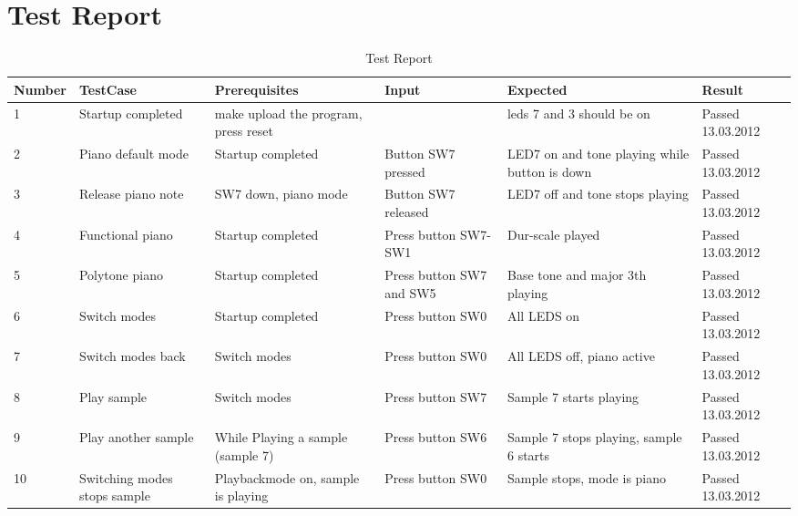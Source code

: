 \section{Test Report}
\begin{table}[h]
  \begin{tabular}{|p{1.1cm}|p{1.5cm}|p{2cm}|p{2cm}|p{2cm}|p{2cm}|}
    \hline
    Number&
    TestCase&
    Prerequisites&
    Input&
    Expected&
    Result\\
    \hline
    1& Startup completed&
    make upload the program, press reset&
    &
    leds 7 and 3 should be on&
    \textcolor{dkgreen}{Passed} 13.03.2012\\
    \hline
    2&
    Piano default mode&
    Startup completed&
    Button SW7 pressed&
    LED7 on and tone playing while button is down&
    \textcolor{dkgreen}{Passed} 13.03.2012\\
    \hline
    3&
    Release piano note&
    SW7 down, piano mode&
    Button SW7 released&
    LED7 off and tone stops playing&
    \textcolor{dkgreen}{Passed} 13.03.2012\\
    \hline
    4&
    Functional piano&
    Startup completed&
    Press button SW7-SW1&
    Dur-scale played&
    \textcolor{dkgreen}{Passed} 13.03.2012\\
    \hline
    5&
    Polytone piano&
    Startup completed&
    Press button SW7 and SW5&
    Base tone and major 3th playing&
    \textcolor{dkgreen}{Passed} 13.03.2012\\

    \hline
    6&
    Switch modes&
    Startup completed&
    Press button SW0&
    All LEDS on&
    \textcolor{dkgreen}{Passed} 13.03.2012\\
    \hline
    7&
    Switch modes back&
    Switch modes&
    Press button SW0&
    All LEDS off, piano active&
    \textcolor{dkgreen}{Passed} 13.03.2012\\
    \hline
    8&
    Play sample&
    Switch modes&
    Press button SW7&
    Sample 7 starts playing&
    \textcolor{dkgreen}{Passed} 13.03.2012\\
    \hline
    9&
    Play another sample&
    While Playing a sample (sample 7)&
    Press button SW6&
    Sample 7 stops playing, sample 6 starts&
    \textcolor{dkgreen}{Passed} 13.03.2012\\
    \hline
    10&
    Switching modes stops sample&
    Playbackmode on, sample is playing&
    Press button SW0&
    Sample stops, mode is piano&
    \textcolor{dkgreen}{Passed} 13.03.2012\\
    \hline

  \end{tabular}
  \caption{Test Report}
\end{table}
